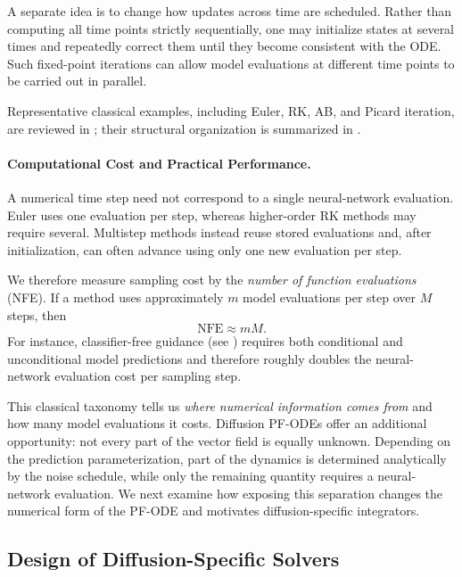 A separate idea is to change how updates across time are scheduled. Rather
than computing all time points strictly sequentially, one may initialize states
at several times and repeatedly correct them until they become consistent with
the ODE. Such fixed-point iterations can allow model evaluations at different
time points to be carried out in parallel.

Representative classical examples, including Euler, RK,
AB, and Picard iteration, are reviewed in
; their structural organization is summarized in
.

\paragraph{Computational Cost and Practical Performance.}
A numerical time step need not correspond to a single neural-network
evaluation. Euler uses one evaluation per step, whereas higher-order
RK methods may require several. Multistep methods instead reuse
stored evaluations and, after initialization, can often advance using only one
new evaluation per step.

We therefore measure sampling cost by the \emph{number of function
evaluations} (NFE). If a method uses approximately $m$ model evaluations per
step over $M$ steps, then 
\[
\mathrm{NFE}\approx mM.
\]
For instance, classifier-free guidance (see ) requires both
conditional and unconditional model predictions and therefore roughly doubles
the neural-network evaluation cost per sampling step.

This classical taxonomy tells us \emph{where numerical information comes from}
and how many model evaluations it costs. Diffusion PF-ODEs offer an additional
opportunity: not every part of the vector field is equally unknown. Depending
on the prediction parameterization, part of the dynamics is determined
analytically by the noise schedule, while only the remaining quantity requires
a neural-network evaluation. We next examine how exposing this separation
changes the numerical form of the PF-ODE and motivates diffusion-specific
integrators.






\subsection{Design of Diffusion-Specific Solvers}
\label{subsec:common_design_solvers}


